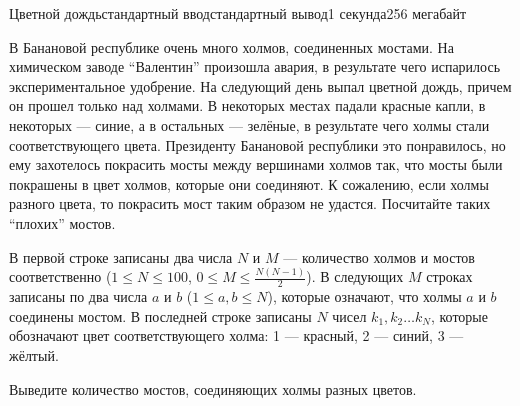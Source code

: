 \begin{problem}{Цветной дождь}{стандартный ввод}{стандартный вывод}{1 секунда}{256 мегабайт}

В Банановой республике очень много холмов, соединенных мостами. На химическом заводе ``Валентин'' произошла авария, в результате чего испарилось экспериментальное удобрение. На следующий день выпал цветной дождь, причем он прошел только над холмами. В некоторых местах падали красные капли, в некоторых --- синие, а в остальных --- зелёные, в результате чего холмы стали соответствующего цвета. Президенту Банановой республики это понравилось, но ему захотелось покрасить мосты между вершинами холмов так, что мосты были покрашены в цвет холмов, которые они соединяют. К сожалению, если холмы разного цвета, то покрасить мост таким образом не удастся. Посчитайте таких ``плохих'' мостов.

\InputFile
В первой строке записаны два числа $N$ и $M$ --- количество холмов и мостов соответственно ($1 \le N \le 100$, $0 \le M \le \frac{N(N - 1)}{2}$). В следующих $M$ строках записаны по два числа $a$ и $b$ ($1 \le a, b \le N$), которые означают, что холмы $a$ и $b$ соединены мостом.
В последней строке записаны $N$ чисел $k_1, k_2 \ldots k_N$, которые обозначают цвет соответствующего холма: 1 --- красный, 2 --- синий, 3 --- жёлтый.

\OutputFile
Выведите количество мостов, соединяющих холмы разных цветов.

\Examples

\begin{example}
%
%
\end{example}

\end{problem}

